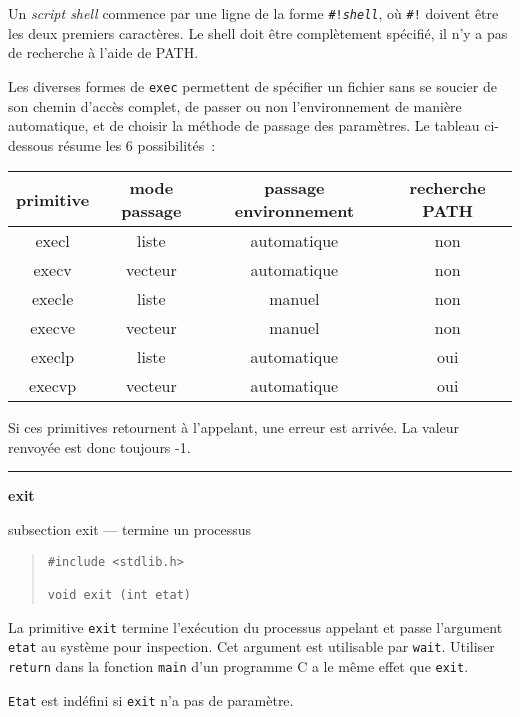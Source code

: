 \documentclass [twoside] {report}
\newcommand {\primitive} [1]
    {
	{\large \bf #1}
	\addcontentsline {toc} {subsection} {#1}
    }
\newcommand {\separation}
    {
	\vspace {7mm}
	\nopagebreak
	\hrule
    }
\begin{document}
Un {\it script shell} commence par une ligne de la
forme {\tt \#!{\it shell}}, où {\tt \#!} doivent être les deux
premiers caractères. Le shell doit être
complètement spécifié, il n'y a pas de recherche à
l'aide de PATH.

Les diverses formes de {\tt exec} permettent de
spécifier un fichier sans se soucier de son chemin
d'accès complet, de passer ou non l'environnement
de manière automatique, et de choisir la méthode
de passage des paramètres. Le tableau ci-dessous
résume les 6 possibilités~:

\begin {center}
    \begin {tabular} {|c|c|c|c|}
	\hline
	\multicolumn {1}{|c|}{primitive} &
	\multicolumn {1}{|c|}{mode passage} &
	\multicolumn {1}{|c|}{passage environnement} &
	\multicolumn {1}{|c|}{recherche PATH} \\
	\hline
	\hline
	execl	&    liste	& automatique &  non \\
	execv	&  vecteur	& automatique &  non \\
	execle	&    liste	&      manuel &  non \\
	execve	&  vecteur	&      manuel &  non \\
	execlp	&    liste	& automatique &  oui \\
	execvp	&  vecteur	& automatique &  oui \\
	\hline
    \end {tabular}
\end {center}


Si ces primitives retournent à l'appelant, une erreur est
arrivée. La valeur renvoyée est donc toujours -1.




\separation
\primitive {exit} --- termine un processus

\begin {quote}
\begin {verbatim}
#include <stdlib.h>

void exit (int etat)
\end{verbatim}
\end {quote}

La primitive {\tt exit} termine l'exécution du
processus appelant et passe l'argument {\tt etat} au
système pour inspection. Cet argument est
utilisable par {\tt wait}. Utiliser {\tt return} dans la
fonction {\tt main} d'un programme C a le même effet
que {\tt exit}.

{\tt Etat} est indéfini si {\tt exit} n'a pas de
paramètre.
\end{document}
